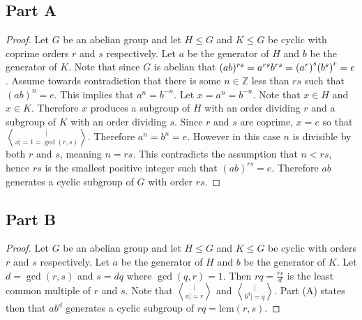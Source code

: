 \documentclass[12pt]{extarticle}
\begin{document}
\subsection*{Part A}
\begin{proof}
	Let $G$ be an abelian group and let $H \leq G$ and $K \leq G$ be cyclic with coprime orders $r$ and $s$ respectively. Let $a$ be the generator of $H$ and $b$ be the generator of $K$. Note that since $G$ is abelian that $(ab)^{rs} = a^{rs} b^{rs} = \qty(a^r)^s \qty(b^s)^r = e$. Assume towards contradiction that there is some $n \in \mathbb{Z}$ less than $rs$ such that $(ab)^n = e$. This implies that $a^n = b^{-n}$. Let $x = a^n = b^{-n}$. Note that $x \in H$ and $x \in K$. Therefore $x$ produces a subgroup of $H$ with an order dividing $r$ and a subgroup of $K$ with an order dividing $s$. Since $r$ and $s$ are coprime, $x = e$ so that $|\bangle{x}| = 1 = \gcd(r,s)$. Therefore $a^n = b^n = e$. However in this case $n$ is divisible by both $r$ and $s$, meaning $n = rs$. This contradicts the assumption that $n < rs$, hence $rs$ is the smallest positive integer such that $(ab)^{rs} = e$. Therefore $ab$ generates a cyclic subgroup of $G$ with order $rs$.
\end{proof}

\subsection*{Part B}
\begin{proof}
	Let $G$ be an abelian group and let $H \leq G$ and $K \leq G$ be cyclic with orders $r$ and $s$ respectively. Let $a$ be the generator of $H$ and $b$ be the generator of $K$. Let $d = \gcd(r,s)$ and $s = dq$ where $\gcd(q,r) = 1$. Then $rq = \frac{rs}{d}$ is the least common multiple of $r$ and $s$. Note that $|\bangle{a}| = r$ and $|\bangle{b^d}| = q$. Part (A) states then that $ab^d$ generates a cyclic subgroup of $rq = \text{lcm}(r,s)$.
\end{proof}
\end{document}
